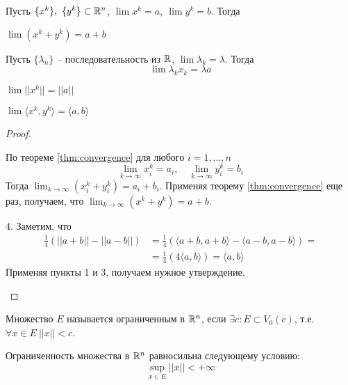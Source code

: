     \begin{Thm}
        Пусть $\{x^k\}, \ \{y^k\} \subset \mathbb{R}^n$, $\lim x^k = a, \ \lim y^k = b$. Тогда
        \begin{MyList}
            \item $\lim(x^k + y^k) = a + b$
            \item Пусть $\{\lambda_n\}$ -- последовательность из $\mathbb{R}$, $\lim \lambda_k = \lambda$. Тогда
            \[\lim \lambda_k x_k = \lambda a\] 
            \item $\lim ||x^k|| = ||a||$
            \item $\lim \langle x^k, y^k\rangle = \langle a, b\rangle$
        \end{MyList} 
    \end{Thm}

    \begin{proof}
        \begin{MyList}
            \item По теореме \ref{thm:convergence} для любого $i = 1, ..., n$
            \[\lim_{k \to \infty} x_i^k = a_i, \quad \lim_{k \to \infty} y_i^k = b_i\]
            Тогда $\lim_{k \to \infty} (x_i^k + y_i^k) = a_i + b_i$. Применяя теорему \ref{thm:convergence} еще раз, получаем, что
            $\lim_{k \to \infty} (x^k + y^k) = a + b$.
            \item[4.] Заметим, что 
            \begin{align*}
                \frac{1}{4} (||a + b|| - ||a - b||) &= \frac{1}{4}(\langle a + b, a + b\rangle - \langle a - b, a - b\rangle) = \\
                &= \frac{1}{4} (4 \langle a, b\rangle) = \langle a, b\rangle
            \end{align*}
            Применяя пункты 1 и 3, получаем нужное утверждение.
        \end{MyList}
    \end{proof}

    \begin{Def}
        Множество $E$ называется ограниченным в $\mathbb{R}^n$, если $\exists c : E \subset V_0(c)$,
        т.е. $\forall x \in E \ ||x|| < c$.
    \end{Def}

    \begin{Rem}
        Ограниченность множества в $\mathbb{R}^n$ равносильна следующему условию:
        \[\sup_{x \in E} ||x|| < +\infty\]
    \end{Rem}

